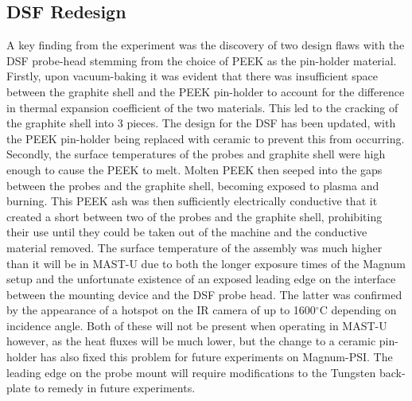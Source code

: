 \documentclass[a4paper, 12pt]{article} %
\begin{document}
\subsection{DSF Redesign}
%
	A key finding from the experiment was the discovery of two design flaws with the DSF probe-head stemming from the choice of PEEK as the pin-holder material.
	Firstly, upon vacuum-baking it was evident that there was insufficient space between the graphite shell and the PEEK pin-holder to account for the difference in thermal expansion coefficient of the two materials.
	This led to the cracking of the graphite shell into 3 pieces.
	The design for the DSF has been updated, with the PEEK pin-holder being replaced with ceramic to prevent this from occurring.
	Secondly, the surface temperatures of the probes and graphite shell were high enough to cause the PEEK to melt.
	Molten PEEK then seeped into the gaps between the probes and the graphite shell, becoming exposed to plasma and burning. 
	This PEEK ash was then sufficiently electrically conductive that it created a short between two of the probes and the graphite shell, prohibiting their use until they could be taken out of the machine and the conductive material removed.
	The surface temperature of the assembly was much higher than it will be in MAST-U due to both the longer exposure times of the Magnum setup and the unfortunate existence of an exposed leading edge on the interface between the mounting device and the DSF probe head. 
	The latter was confirmed by the appearance of a hotspot on the IR camera of up to 1600$^{\circ}$C depending on incidence angle.
	Both of these will not be present when operating in MAST-U however, as the heat fluxes will be much lower, but the change to a ceramic pin-holder has also fixed this problem for future experiments on Magnum-PSI. 
	The leading edge on the probe mount will require modifications to the Tungsten back-plate to remedy in future experiments.
\end{document}
